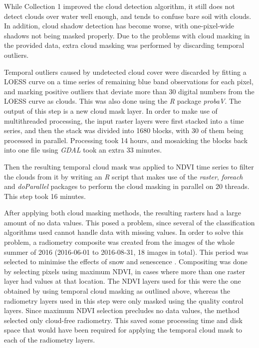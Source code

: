 \documentclass[a4paper,10pt]{book}
\begin{document}
While Collection 1 improved the cloud detection algorithm, it still does not detect clouds over water well enough, and tends to confuse bare soil with clouds. In addition, cloud shadow detection has become worse, with one-pixel-wide shadows not being masked properly. Due to the problems with cloud masking in the provided data, extra cloud masking was performed by discarding temporal outliers.

Temporal outliers caused by undetected cloud cover were discarded by fitting a LOESS curve on a time series of remaining blue band observations for each pixel, and marking positive outliers that deviate more than 30 digital numbers from the LOESS curve as clouds. This was also done using the \textit{R} package \textit{probaV}. The output of this step is a new cloud mask layer. In order to make use of multithreaded processing, the input raster layers were first stacked into a time series, and then the stack was divided into 1680 blocks, with 30 of them being processed in parallel. Processing took 14 hours, and mosaicking the blocks back into one file using \textit{GDAL} took an extra 33 minutes.

Then the resulting temporal cloud mask was applied to NDVI time series to filter the clouds from it by writing an \textit{R} script that makes use of the \textit{raster}, \textit{foreach} and \textit{doParallel} packages to perform the cloud masking in parallel on 20 threads. This step took 16 minutes.

After applying both cloud masking methods, the resulting rasters had a large amount of no data values. This posed a problem, since several of the classification algorithms used cannot handle data with missing values. In order to solve this problem, a radiometry composite was created from the images of the whole summer of 2016 (2016-06-01 to 2016-08-31, 18 images in total). This period was selected to minimise the effects of snow and senescence \citep{bartalev2014probavboreal}. Compositing was done by selecting pixels using maximum NDVI, in cases where more than one raster layer had values at that location. The NDVI layers used for this were the one obtained by using temporal cloud masking as outlined above, whereas the radiometry layers used in this step were only masked using the quality control layers. Since maximum NDVI selection precludes no data values, the method selected only cloud-free radiometry. This saved some processing time and disk space that would have been required for applying the temporal cloud mask to each of the radiometry layers.
\end{document}
